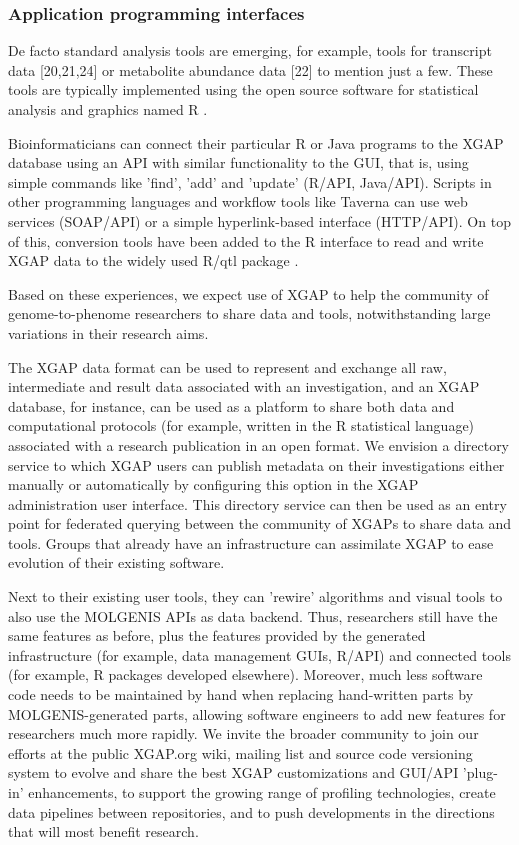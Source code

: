 \subsubsection{Application programming interfaces}
De facto standard analysis tools are emerging, for example, tools for transcript data [20,21,24] or 
metabolite abundance data [22] to mention just a few. These tools are typically implemented using the 
open source software for statistical analysis and graphics named R \cite{Ihaka:1996}. 

Bioinformaticians can connect their particular R or Java programs to the XGAP database using an API 
with similar functionality to the GUI, that is, using simple commands like 'find', 'add' and 'update' 
(R/API, Java/API). Scripts in other programming languages and workflow tools like Taverna \cite{Oinn:2004} can 
use web services (SOAP/API) or a simple hyperlink-based interface (HTTP/API). On top of this, conversion 
tools have been added to the R interface to read and write XGAP data to the widely used R/qtl package \cite{broman:2003, Arends:2010}.

Based on these experiences, we expect use of XGAP to help the community of genome-to-phenome 
researchers to share data and tools, notwithstanding large variations in their research aims. 

The XGAP data format can be used to represent and exchange all raw, intermediate and result 
data associated with an investigation, and an XGAP database, for instance, can be used as a 
platform to share both data and computational protocols (for example, written in the R 
statistical language) associated with a research publication in an open format. We envision 
a directory service to which XGAP users can publish metadata on their investigations either 
manually or automatically by configuring this option in the XGAP administration user interface. 
This directory service can then be used as an entry point for federated querying between the 
community of XGAPs to share data and tools. Groups that already have an infrastructure can 
assimilate XGAP to ease evolution of their existing software.

Next to their existing user tools, they can 'rewire' algorithms and visual tools to also use 
the MOLGENIS APIs as data backend. Thus, researchers still have the same features as before, 
plus the features provided by the generated infrastructure (for example, data management GUIs, 
R/API) and connected tools (for example, R packages developed elsewhere). Moreover, much 
less software code needs to be maintained by hand when replacing hand-written parts by 
MOLGENIS-generated parts,  allowing software engineers to add new features for researchers 
much more rapidly. We invite the broader community to join our efforts at the public XGAP.org 
wiki, mailing list and source code versioning system to evolve and share the best XGAP 
customizations and GUI/API 'plug-in' enhancements, to support the growing range of profiling 
technologies, create data pipelines between repositories, and to push developments in the 
directions that will most benefit research.

